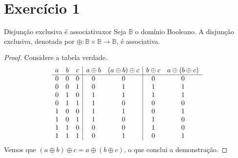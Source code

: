 \section{Exercício 1}
\begin{lemma}{Disjunção exclusiva é associativa}{xor}
    Seja \(\mathbb{B}\) o domínio Booleano. A disjunção exclusiva, denotada por \(\oplus : \mathbb{B} \times \mathbb{B} \to \mathbb{B}\), é associativa.
\end{lemma}
\begin{proof}
    Considere a tabela verdade.
    \begin{equation*}
        \begin{array}{ c c c | c c | c c}
        a & b & c & a \oplus b & (a \oplus b)\oplus c & b \oplus c &  a \oplus (b \oplus c ) \\
         \hline
        0 & 0 & 0 & 0 & 0 & 0 & 0\\
        0 & 0 & 1 & 0 & 1 & 1 & 1\\
        0 & 1 & 0 & 1 & 1 & 1 & 1\\
        0 & 1 & 1 & 1 & 0 & 0 & 0\\
        1 & 0 & 0 & 1 & 1 & 0 & 1\\
        1 & 0 & 1 & 1 & 0 & 1 & 0\\
        1 & 1 & 0 & 0 & 0 & 1 & 0\\
        1 & 1 & 1 & 0 & 1 & 0 & 1
        \end{array}
    \end{equation*}
    Vemos que \((a \oplus b) \oplus c = a \oplus (b \oplus c)\), o que conclui a demonstração.
\end{proof}

